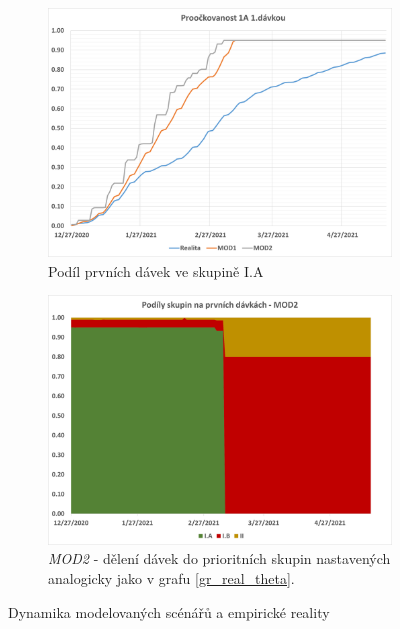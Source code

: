 \begin{figure}
\begin{subfigure}{0.45\textwidth}
\includegraphics[width=\textwidth]{assets/1A_proockovanost}
\caption{Podíl prvních dávek ve skupině I.A}
\label{gr_mod_prvni_davka}
\end{subfigure}
%
\begin{subfigure}{0.45\textwidth}
\includegraphics[width=\textwidth]{assets/theta_mod2}
\caption{\emph{MOD2} - dělení dávek do prioritních skupin nastavených analogicky jako v grafu \ref{gr_real_theta}.}
\label{gr_mod2_theta}
\end{subfigure}

\caption{Dynamika modelovaných scénářů a empirické reality}
\label{gr_modelace}

\end{figure}

